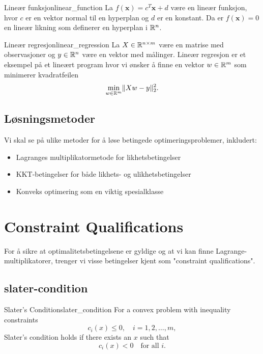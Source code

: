 \begin{example}{Lineær funksjon}{linear_function}
  La \(f(\symbf{x}) = c^T\symbf{x} + d\) være en lineær funksjon, hvor \(c\) er en vektor normal til en hyperplan og \(d\) er en konstant.
  Da er \(f(\symbf{x}) = 0\) en lineær likning som definerer en hyperplan i \(\mathbb{R}^n\).
\end{example}

\begin{example}{Lineær regresjon}{linear_regression}
  La \(X \in \mathbb{R}^{n \times m}\) være en matrise med observasjoner og \(y \in \mathbb{R}^n\) være en vektor med målinger.
  Lineær regresjon er et eksempel på et lineært program hvor vi ønsker å finne en vektor \(w \in \mathbb{R}^m\) som minimerer kvadratfeilen
  \begin{equation*}
    \min_{w \in \mathbb{R}^m} \lVert Xw - y\rVert_2^2.
  \end{equation*}
\end{example}

\section{Løsningsmetoder}

Vi skal se på ulike metoder for å løse betingede optimeringsproblemer, inkludert:
\begin{itemize}
  \item Lagranges multiplikatormetode for likhetsbetingelser
  \item KKT-betingelser for både likhets- og ulikhetsbetingelser
  \item Konveks optimering som en viktig spesialklasse
\end{itemize}

\chapter{Constraint Qualifications}

For å sikre at optimalitetsbetingelsene er gyldige og at vi kan finne Lagrange-multiplikatorer, trenger vi visse betingelser kjent som "constraint qualifications".

\section[Slaters betingelse]{\gls{slater-condition}}

\begin{definition}{Slater's Condition}{slater_condition}
  For a convex problem with inequality constraints
  \[
    c_i(x) \le 0,\quad i=1,2,\dots,m,
  \]
  Slater's condition holds if there exists an \(x\) such that
  \[
    c_i(x) < 0 \quad \text{for all } i.
  \]
\end{definition}

